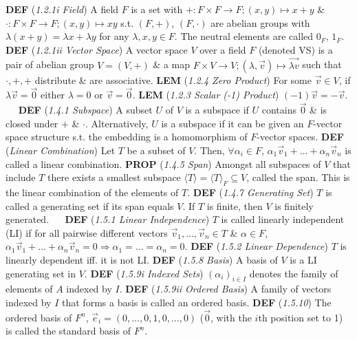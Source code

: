 \documentclass{article}
\newcommand{\wde}[1]{\textcolor{defc}{\textbf{DEF}} (\textcolor{namec}{\textit{#1}})}
\newcommand{\wl}[1]{\textcolor{lemc}{\textbf{LEM}} (\textcolor{namec}{\textit{#1}})}
\newcommand{\wpr}[1]{\textcolor{propc}{\textbf{PROP}} (\textcolor{namec}{\textit{#1}})}
\begin{document}
\begin{multicols}{2}

  \noindent %
  \wde{1.2.1i Field} A field $F$ is a set with $+ : F \times F \to F; (x, y) \mapsto x + y$ \& $\cdot : F \times F \to F; (x, y) \mapsto xy$ s.t. $(F,+)$, $(F,\cdot)$ are abelian groups with $\lambda(x + y) = \lambda x + \lambda y$  for any $\lambda, x, y \in F$. The neutral elements are called $0_{F}$, $1_{F}$.
  \wde{1.2.1ii Vector Space} A vector space $V$ over a field $F$ (denoted VS) is a pair of abelian group $V=(V, +)$ \& a map $F \times V \to V; (\lambda, \vec{v}) \mapsto \vec{\lambda v}$ such that $\cdot,+,+$ distribute \& are associative.
  \wl{1.2.4 Zero Product} For some $\vec{v} \in V$, if $\lambda\vec{v} = \vec{0}$ either $\lambda=0$ or $\vec{v}=\vec{0}$.
  \wl{1.2.3 Scalar (-1) Product} $(-1)\vec{v} = -\vec{v}$.
\ \
  \noindent %
  \wde{1.4.1 Subspace} A subset $U$ of $V$ is a subspace if $U$ contains $\vec{0}$ \& is closed under $+$ \& $\cdot$. Alternatively, $U$ is a subspace if it can be given an $F$-vector space structure s.t. the embedding is a homomorphism of $F$-vector spaces.
  \wde{Linear Combination} Let $T$ be a subset of $V$. Then, $\forall \alpha_{i} \in F$, $\alpha_{1}\vec{v}_{1} + \dots + \alpha_{n}\vec{v}_{n}$ is called a linear combination.
  \wpr{1.4.5 Span} Amongst all subspaces of $V$ that include $T$ there exists a smallest subspace $\langle T \rangle = \langle T \rangle_{F} \subseteq V$, called the span. This is the linear combination of the elements of $T$.
  \wde{1.4.7 Generating Set} $T$ is called a generating set if its span equals $V$. If $T$ is finite, then $V$ is finitely generated.
\ \
  \noindent %
  \wde{1.5.1 Linear Independence} $T$ is called linearly independent (LI) if for all pairwise different vectors $\vec{v}_{1},\dots,\vec{v}_{n} \in T$ \& $\alpha \in F$, $\alpha_{1}\vec{v}_{1} + \dots + \alpha_{n}\vec{v}_{n} = 0 \Rightarrow \alpha_{1} = \dots = \alpha_{n} = 0$.
  \wde{1.5.2 Linear Dependence} $T$ is linearly dependent iff. it is not LI.
  \wde{1.5.8 Basis} A basis of $V$ is a LI generating set in $V$.
  \wde{1.5.9i Indexed Sets} $(\alpha_{i})_{i \in I}$ denotes the family of elements of $A$ indexed by $I$.
  \wde{1.5.9ii Ordered Basis} A family of vectors indexed by $I$ that forms a basis is called an ordered basis.
  \wde{1.5.10} The ordered basis of $F^{n}$, $\vec{e}_{i} = (0,\dots,0,1,0,\dots,0)$ ($\vec{0}$, with the $i$th position set to 1) is called the standard basis of $F^{n}$.

\end{multicols}
\end{document}
